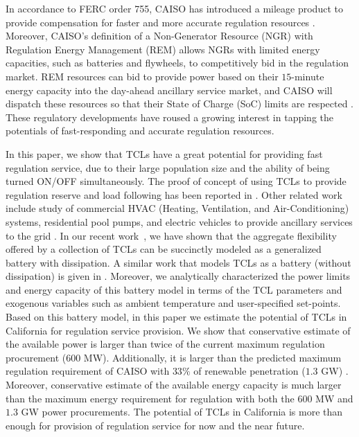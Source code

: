 \documentclass[onecolumn,journal]{IEEEtran}
\begin{document}
In accordance to FERC order 755, CAISO has introduced a mileage product to provide compensation for faster and more accurate regulation resources \cite{CAISO_755}. Moreover, CAISO's definition of a Non-Generator Resource (NGR) with Regulation Energy Management (REM) allows NGRs with limited energy capacities, such as batteries and flywheels, to competitively bid in the regulation market. REM resources can bid to provide power based on their $15$-minute energy capacity into the day-ahead ancillary service market, and \ac{CAISO} will dispatch these resources so that their State of Charge (SoC) limits are respected \cite{CAISO_storage}. These regulatory developments have roused a growing interest in tapping the potentials of  fast-responding and accurate regulation resources. 



In this paper, we show that \acp{TCL} have a great potential for providing fast regulation service, due to their large population size and the ability of being turned ON/OFF simultaneously. The proof of concept of using \acp{TCL} to provide regulation reserve and load following has been reported in \cite{lu2012evaluation, mathieu2013state, Hiskens, zhang2013aggregated, bashash2013modeling}. Other related work include study of commercial HVAC (Heating, Ventilation, and Air-Conditioning) systems, residential pool pumps, and electric vehicles to provide ancillary services to the grid \cite{lin2013low, HH_YL_AK_PB_SM_TSG:14, oldewurtel2013towards, meyn2014ancillary,haocharacterizing,barooahspectral, kempton2008test,AN_JT_AS_KP_PV_CDC:13}.  In our recent work~\cite{hehao2013generalized,HH_BS_KP_TV_TPS_2013}, we have shown that the aggregate flexibility offered by a collection of \acp{TCL} can be succinctly modeled as a generalized battery with dissipation. A similar work that models TCLs as a battery (without dissipation) is given in \cite{mathieu2013energy}. Moreover, we analytically characterized the power limits and energy capacity of this battery model in terms of the \ac{TCL} parameters and exogenous variables such as ambient temperature and user-specified set-points. Based on this battery model, in this paper we estimate the potential of \acp{TCL} in California for regulation service provision. We show that conservative estimate of the available power is larger than twice of the current maximum regulation procurement ($600$ MW). Additionally,  it is larger than the predicted maximum regulation requirement of \ac{CAISO} with $33\%$ of renewable penetration ($1.3$ GW)  \cite{helman2010resource}. Moreover, conservative estimate of the available energy capacity is much larger than the maximum energy requirement for regulation with both the $600$ MW and $1.3$ GW power procurements. The potential of \acp{TCL} in California is more than enough for provision of regulation service for now and the near future.
\end{document}
